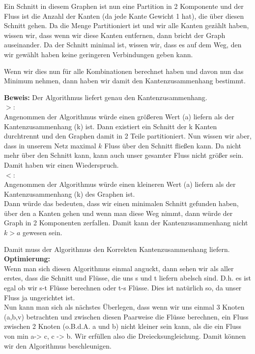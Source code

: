 \documentclass[11pt,a4paper,ngerman]{article}
\begin{document}
Ein Schnitt in diesem Graphen ist nun eine Partition in 2 Komponente und der Fluss ist die Anzahl der Kanten (da jede Kante Gewicht 1 hat), die über diesen Schnitt gehen. Da die Menge Partitioniert ist und wir alle Kanten gezählt haben, wissen wir, dass wenn wir diese Kanten entfernen, dann bricht der Graph auseinander. Da der Schnitt minimal ist, wissen wir, dass es auf dem Weg, den wir gewählt haben keine geringeren Verbindungen geben kann.

Wenn wir dies nun für alle Kombinationen berechnet haben und davon nun das Minimum nehmen, dann haben wir damit den Kantenzusammenhang bestimmt.

\textbf{Beweis:} Der Algorithmus liefert genau den Kantenzusammenhang.\\

$>$:\\
Angenommen der Algorithmus würde einen größeren Wert (a) liefern als der Kantenzusammenhang (k) ist. Dann existiert ein Schnitt der k Kanten durchtrennt und den Graphen damit in 2 Teile partitioniert. Nun wissen wir aber, dass in unserem Netz maximal $k$ Fluss über den Schnitt fließen kann. Da nicht mehr über den Schnitt kann, kann auch unser gesamter Fluss nicht größer sein. Damit haben wir einen Wiederspruch.\\

$<$:\\
Angenommen der Algorithmus würde einen kleineren Wert (a) liefern als der Kantenzusammenhang (k) des Graphen ist.\\
Dann würde das bedeuten, dass wir einen minimalen Schnitt gefunden haben, über den a Kanten gehen und wenn man diese Weg nimmt, dann würde der Graph in 2 Komponenten zerfallen. Damit kann der Kantenzusammenhang nicht $k>a$ gewesen sein.\

Damit muss der Algorithmus den Korrekten Kantenzusammenhang liefern.\\

\textbf{Optimierung:}\\
Wenn man sich diesen Algorithmus einmal anguckt, dann sehen wir als aller erstes, dass die Schnitt und Flüsse, die uns s und t liefern abelsch sind. D.h. es ist egal ob wir s-t Flüsse berechnen oder t-s Flüsse. Dies ist natürlich so, da unser Fluss ja ungerichtet ist.\\

Nun kann man sich als nächstes Überlegen, dass wenn wir uns einmal 3 Knoten (a,b,v) betrachten und zwischen diesen Paarweise die Flüsse berechnen, ein Fluss zwischen 2 Knoten (o.B.d.A. a und b) nicht kleiner sein kann, als die ein Fluss von min { a-> c, c -> b}. Wir erfüllen also die Dreiecksungleichung. Damit können wir den Algorithmus beschleunigen.\\
\end{document}
